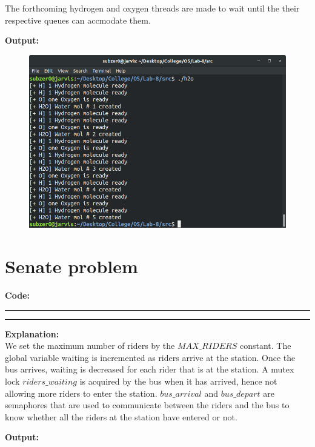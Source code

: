 \documentclass{article}
\begin{document}
The forthcoming hydrogen and oxygen threads are made to wait until the their respective queues can
accmodate them.

\bigskip
\noindent
\textbf{\Large Output:}

\begin{figure}[h]
	\includegraphics[width=\textwidth]{output/h2o.png}
\end{figure}
\bigskip

\section*{Senate problem}
\par\noindent
\textbf{\Large Code:}
\smallskip
\par\noindent\rule{\textwidth}{0.4pt}

\par\noindent\rule{\textwidth}{0.4pt}

\bigskip
\noindent
\textbf{\Large Explanation: } \\

We set the maximum number of riders by the $MAX\_RIDERS$ constant. The global variable 
waiting is incremented as riders arrive at the station. Once the bus arrives, waiting
is decreased for each rider that is at the station. A mutex lock $riders\_waiting$ is acquired
by the bus when it has arrived, hence not allowing more riders to enter the station. 
$bus\_arrival$ and $bus\_depart$ are semaphores that are used to communicate between the riders
and the bus to know whether all the riders at the station have entered or not.


\bigskip
\noindent
\textbf{\Large Output:}
\end{document}
